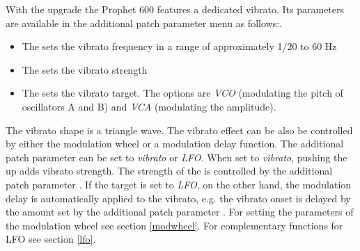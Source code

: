 With the upgrade the Prophet 600 features a dedicated vibrato. Its parameters are available in the additional patch parameter menu as follows:.

\begin{itemize}
  \item The \vibspeed sets the vibrato frequency in a range of approximately 1/20 to 60 Hz
  \item The \vibamt sets the vibrato strength
  \item The \vibtgt sets the vibrato target. The options are \textit{VCO} (modulating the pitch of oscillators A  and B) and \textit{VCA} (modulating the amplitude). 
\end{itemize}

The vibrato shape is a triangle wave. The vibrato effect can be also be controlled by either the modulation wheel or a modulation delay function. The additional patch parameter \modwheeltarget can be set to \textit{vibrato} or \textit{LFO}. When set to \textit{vibrato}, pushing the \modwheel up adds vibrato strength. The strength of the \modwheel is controlled by the additional patch parameter \modwheelrange. If the \modwheel target is set to \textit{LFO}, on the other hand, the modulation delay is automatically applied to the vibrato, e.g. the vibrato onset is delayed by the amount set by the additional patch parameter \moddelay. For setting the parameters of the modulation wheel see section \ref{modwheel}. For complementary functions for LFO see section \ref{lfo}.
